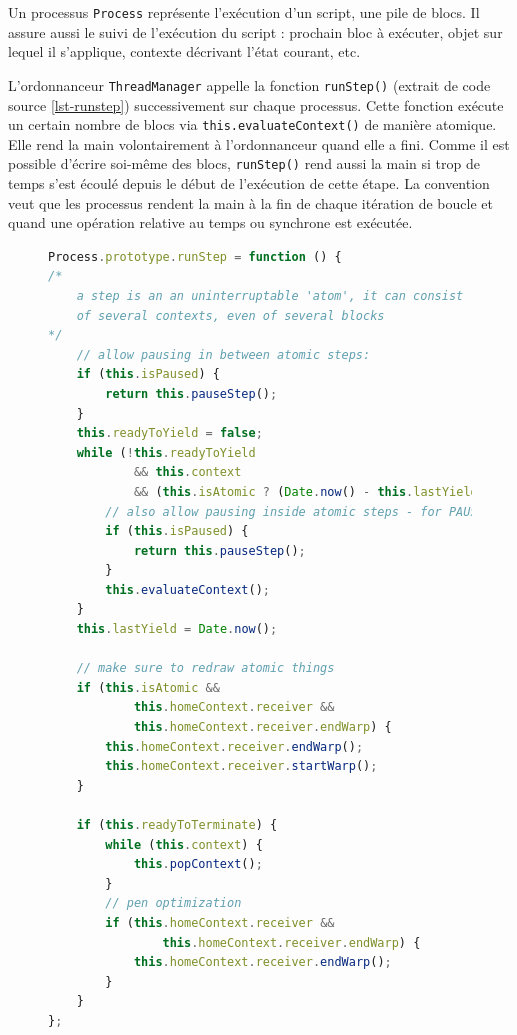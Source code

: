 Un processus \texttt{Process} représente l'exécution d'un \gls{script}, une pile de \glspl{bloc}. Il assure aussi le suivi de l'exécution du \gls{script} : prochain \gls{bloc} à exécuter, objet sur lequel il s'applique, contexte décrivant l'état courant, etc.

L'ordonnanceur \texttt{ThreadManager} appelle la fonction \texttt{runStep()} (extrait de code source \ref{lst-runstep}) successivement sur chaque processus. Cette fonction exécute un certain nombre de \glspl{bloc} via \texttt{this.evaluateContext()} de manière atomique. Elle rend la main volontairement à l'ordonnanceur quand elle a fini. Comme il est possible d'écrire soi-même des \glspl{bloc}, \texttt{runStep()} rend aussi la main si trop de temps s'est écoulé depuis le début de l'exécution de cette étape. La convention veut que les processus rendent la main à la fin de chaque itération de boucle et quand une opération relative au temps ou synchrone est exécutée.
\begin{figure}
\begin{lstlisting}[caption={Fonction \texttt{runStep()} de \texttt{Process}},label=lst-runstep,language=JavaScript]
Process.prototype.runStep = function () {
/*
    a step is an an uninterruptable 'atom', it can consist
    of several contexts, even of several blocks
*/
    // allow pausing in between atomic steps:
    if (this.isPaused) {
        return this.pauseStep();
    }
    this.readyToYield = false;
    while (!this.readyToYield
            && this.context
            && (this.isAtomic ? (Date.now() - this.lastYield < this.timeout) : true) ) {
        // also allow pausing inside atomic steps - for PAUSE block primitive:
        if (this.isPaused) {
            return this.pauseStep();
        }
        this.evaluateContext();
    }
    this.lastYield = Date.now();

    // make sure to redraw atomic things
    if (this.isAtomic &&
            this.homeContext.receiver &&
            this.homeContext.receiver.endWarp) {
        this.homeContext.receiver.endWarp();
        this.homeContext.receiver.startWarp();
    }

    if (this.readyToTerminate) {
        while (this.context) {
            this.popContext();
        }
        // pen optimization
        if (this.homeContext.receiver &&
                this.homeContext.receiver.endWarp) {
            this.homeContext.receiver.endWarp();
        }
    }
};
\end{lstlisting}
\end{figure}


